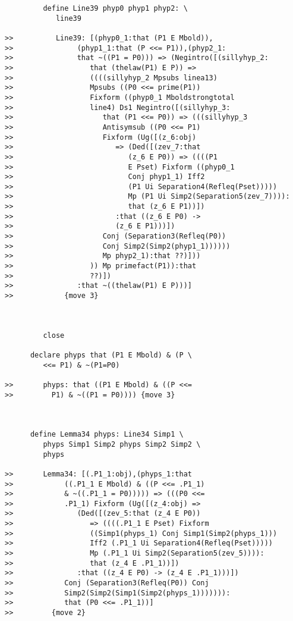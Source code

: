 \documentclass[12pt]{article}
\begin{document}
\begin{verbatim}
         define Line39 phyp0 phyp1 phyp2: \
            line39

>>          Line39: [(phyp0_1:that (P1 E Mbold)),
>>               (phyp1_1:that (P <<= P1)),(phyp2_1:
>>               that ~((P1 = P0))) => (Negintro([(sillyhyp_2:
>>                  that (thelaw(P1) E P)) =>
>>                  ((((sillyhyp_2 Mpsubs linea13)
>>                  Mpsubs ((P0 <<= prime(P1))
>>                  Fixform ((phyp0_1 Mboldstrongtotal
>>                  line4) Ds1 Negintro([(sillyhyp_3:
>>                     that (P1 <<= P0)) => (((sillyhyp_3
>>                     Antisymsub ((P0 <<= P1)
>>                     Fixform (Ug([(z_6:obj)
>>                        => (Ded([(zev_7:that
>>                           (z_6 E P0)) => ((((P1
>>                           E Pset) Fixform ((phyp0_1
>>                           Conj phyp1_1) Iff2
>>                           (P1 Ui Separation4(Refleq(Pset)))))
>>                           Mp (P1 Ui Simp2(Separation5(zev_7)))):
>>                           that (z_6 E P1))])
>>                        :that ((z_6 E P0) ->
>>                        (z_6 E P1)))])
>>                     Conj (Separation3(Refleq(P0))
>>                     Conj Simp2(Simp2(phyp1_1))))))
>>                     Mp phyp2_1):that ??)]))
>>                  )) Mp primefact(P1)):that
>>                  ??)])
>>               :that ~((thelaw(P1) E P)))]
>>            {move 3}



         close

      declare phyps that (P1 E Mbold) & (P \
         <<= P1) & ~(P1=P0)

>>       phyps: that ((P1 E Mbold) & ((P <<=
>>         P1) & ~((P1 = P0)))) {move 3}



      define Lemma34 phyps: Line34 Simp1 \
         phyps Simp1 Simp2 phyps Simp2 Simp2 \
         phyps

>>       Lemma34: [(.P1_1:obj),(phyps_1:that
>>            ((.P1_1 E Mbold) & ((P <<= .P1_1)
>>            & ~((.P1_1 = P0))))) => (((P0 <<=
>>            .P1_1) Fixform (Ug([(z_4:obj) =>
>>               (Ded([(zev_5:that (z_4 E P0))
>>                  => ((((.P1_1 E Pset) Fixform
>>                  ((Simp1(phyps_1) Conj Simp1(Simp2(phyps_1)))
>>                  Iff2 (.P1_1 Ui Separation4(Refleq(Pset)))))
>>                  Mp (.P1_1 Ui Simp2(Separation5(zev_5)))):
>>                  that (z_4 E .P1_1))])
>>               :that ((z_4 E P0) -> (z_4 E .P1_1)))])
>>            Conj (Separation3(Refleq(P0)) Conj
>>            Simp2(Simp2(Simp1(Simp2(phyps_1))))))):
>>            that (P0 <<= .P1_1))]
>>         {move 2}




\end{verbatim}
\end{document}
